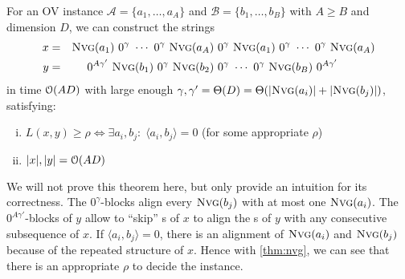\begin{theorem}
\label{thm:small_lcs_construction}
	For an OV instance $\mathcal{A} = \{a_1, \ldots, a_A\}$ and $\mathcal{B} = \{b_1, \ldots, b_B\}$ with $A \geq B$ and dimension $D$, we can construct the strings
\begin{align*}
	x &=& \nvg{a_1}\ 0^\gamma\ \cdots\ 0^\gamma\ \nvg{a_A}\ &0^\gamma\ %
	\nvg{a_1}\ 0^\gamma\ \cdots\ 0^\gamma\ \nvg{a_A}\\
	y&=& 0^{A\gamma'}\ \nvg{b_1}\ 0^{\gamma}\ \nvg{b_2}\ &0^\gamma\ \cdots\ 0^\gamma\ \nvg{b_B}\ 0^{A\gamma'}
\end{align*}
%
in time $\mathcal{O}(AD)$ with large enough $\gamma, \gamma' = \Theta(D) = \Theta(|\text{\textsc{Nvg}}(a_i)| + |\text{\textsc{Nvg}}(b_j)|)$, satisfying:

\begin{enumerate}[(i)]
    \item\label{thm:small_lcs_construction:infer} $L(x,y) \geq \rho \Leftrightarrow \exists a_i, b_j:\; \langle a_i,b_j \rangle = 0$ \quad\quad (for some appropriate $\rho$)

    \item\label{thm:small_lcs_construction:size} $|x|, |y| = \mathcal{O}(AD)$
\end{enumerate}
\end{theorem}	




%	
%
%	
%	
%	
%	
%	

We will not prove this theorem here, but only provide an intuition for its correctness.
The $0^\gamma$-blocks align every $\text{\textsc{Nvg}}(b_j)$ with at most one $\text{\textsc{Nvg}}(a_i)$.
The $0^{A\gamma'}$-blocks of $y$ allow to \enquote{skip} \nvgName{}s of $x$ to align the \nvgName{}s of $y$ with any consecutive subsequence of $x$.
If $\langle a_i, b_j \rangle = 0$, there is an alignment of $\text{\textsc{Nvg}}(a_i)$ and $\text{\textsc{Nvg}}(b_j)$ because of the repeated structure of $x$.
Hence with \autoref{thm:nvg}, we can see that there is an appropriate $\rho$ to decide the \ov{} instance.



